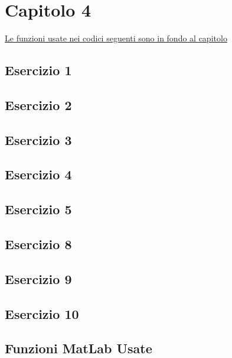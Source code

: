 \section{Capitolo 4}
\underline{Le funzioni usate nei codici seguenti sono in fondo al capitolo}
\subsection{Esercizio 1}

\subsection{Esercizio 2}

\subsection{Esercizio 3}

\subsection{Esercizio 4}

\subsection{Esercizio 5}

\subsection{Esercizio 8}

\subsection{Esercizio 9}

\subsection{Esercizio 10}

\subsection{Funzioni MatLab Usate}
